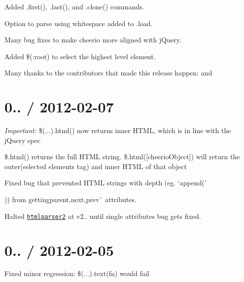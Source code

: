 \begin{DoxyItemize}
\item Added .first(), .last(), and .clone() commands.
\item Option to parse using whitespace added to {\ttfamily .load}.
\item Many bug fixes to make cheerio more aligned with j\+Query.
\item Added \$(\textquotesingle{}\+:root\textquotesingle{}) to select the highest level element.
\end{DoxyItemize}

Many thanks to the contributors that made this release happen\+:  and 

\section*{0.. / 2012-\/02-\/07 }


\begin{DoxyItemize}
\item {\itshape Important\+:} {\ttfamily \$(...).html()} now returns inner H\+T\+ML, which is in line with the j\+Query spec
\item {\ttfamily \$.html()} returns the full H\+T\+ML string. {\ttfamily \$.html(\mbox{[}cheerio\+Object\mbox{]})} will return the outer(selected element\textquotesingle{}s tag) and inner H\+T\+ML of that object
\item Fixed bug that prevented H\+T\+ML strings with depth (eg. `append('
\begin{DoxyItemize}
\item 
\item 
\end{DoxyItemize}\textquotesingle{}){\ttfamily ) from getting}parent{\ttfamily ,}next{\ttfamily ,}prev\`{} attributes.
\item Halted \href{https://github.com/FB55/node-htmlparser}{\tt htmlparser2} at v2.. until single attributes bug gets fixed.
\end{DoxyItemize}

\section*{0.. / 2012-\/02-\/05 }


\begin{DoxyItemize}
\item Fixed minor regression\+: \$(...).text(fn) would fail
\end{DoxyItemize}

